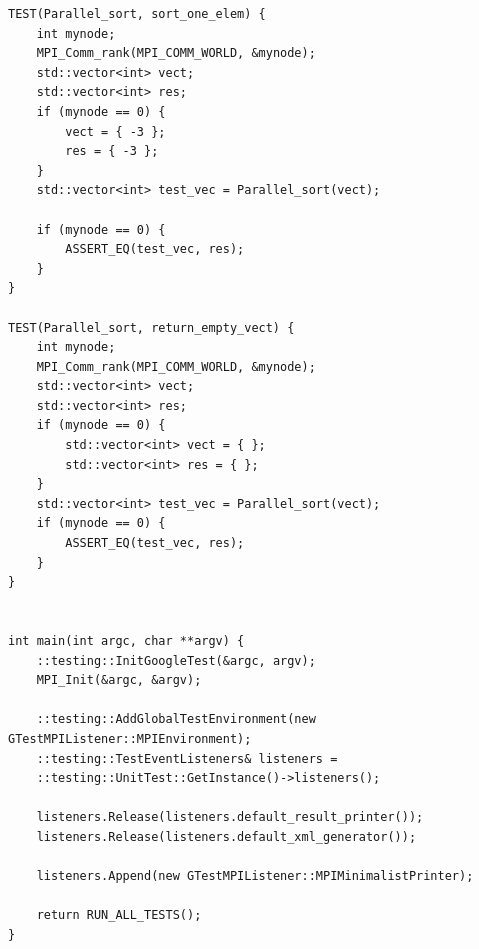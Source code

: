 \documentclass[12pt, letterpaper]{report}
\begin{document}
\begin{verbatim}
TEST(Parallel_sort, sort_one_elem) {
    int mynode;
    MPI_Comm_rank(MPI_COMM_WORLD, &mynode);
    std::vector<int> vect;
    std::vector<int> res;
    if (mynode == 0) {
        vect = { -3 };
        res = { -3 };
    }
    std::vector<int> test_vec = Parallel_sort(vect);

    if (mynode == 0) {
        ASSERT_EQ(test_vec, res);
    }
}

TEST(Parallel_sort, return_empty_vect) {
    int mynode;
    MPI_Comm_rank(MPI_COMM_WORLD, &mynode);
    std::vector<int> vect;
    std::vector<int> res;
    if (mynode == 0) {
        std::vector<int> vect = { };
        std::vector<int> res = { };
    }
    std::vector<int> test_vec = Parallel_sort(vect);
    if (mynode == 0) {
        ASSERT_EQ(test_vec, res);
    }
}


int main(int argc, char **argv) {
    ::testing::InitGoogleTest(&argc, argv);
    MPI_Init(&argc, &argv);

    ::testing::AddGlobalTestEnvironment(new GTestMPIListener::MPIEnvironment);
    ::testing::TestEventListeners& listeners =
    ::testing::UnitTest::GetInstance()->listeners();

    listeners.Release(listeners.default_result_printer());
    listeners.Release(listeners.default_xml_generator());

    listeners.Append(new GTestMPIListener::MPIMinimalistPrinter);

    return RUN_ALL_TESTS();
}

 	\end{verbatim}
\end{document}
